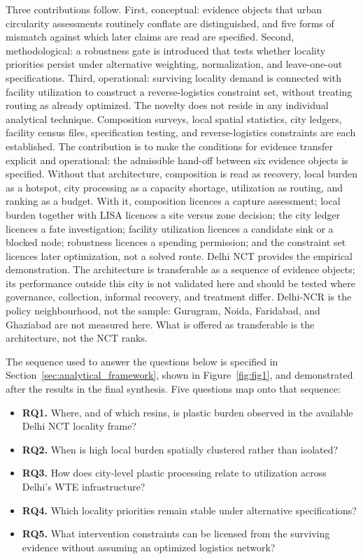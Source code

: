 \documentclass[12pt,a4paper]{article}
\begin{document}
Three contributions follow. First, conceptual: evidence objects that urban circularity assessments routinely conflate are distinguished, and five forms of mismatch against which later claims are read are specified. Second, methodological: a robustness gate is introduced that tests whether locality priorities persist under alternative weighting, normalization, and leave-one-out specifications. Third, operational: surviving locality demand is connected with facility utilization to construct a reverse-logistics constraint set, without treating routing as already optimized. The novelty does not reside in any individual analytical technique. Composition surveys, local spatial statistics, city ledgers, facility census files, specification testing, and reverse-logistics constraints are each established. The contribution is to make the conditions for evidence transfer explicit and operational: the admissible hand-off between six evidence objects is specified. Without that architecture, composition is read as recovery, local burden as a hotspot, city processing as a capacity shortage, utilization as routing, and ranking as a budget. With it, composition licences a capture assessment; local burden together with LISA licences a site versus zone decision; the city ledger licences a fate investigation; facility utilization licences a candidate sink or a blocked node; robustness licences a spending permission; and the constraint set licences later optimization, not a solved route. Delhi NCT provides the empirical demonstration. The architecture is transferable as a sequence of evidence objects; its performance outside this city is not validated here and should be tested where governance, collection, informal recovery, and treatment differ. Delhi-NCR is the policy neighbourhood, not the sample: Gurugram, Noida, Faridabad, and Ghaziabad are not measured here. What is offered as transferable is the architecture, not the NCT ranks.

The sequence used to answer the questions below is specified in Section~\ref{sec:analytical_framework}, shown in Figure~\ref{fig:fig1}, and demonstrated after the results in the final synthesis. Five questions map onto that sequence:

\begin{itemize}
\itemsep0.4em
\item \textbf{RQ1.} Where, and of which resins, is plastic burden observed in the available Delhi NCT locality frame?
\item \textbf{RQ2.} When is high local burden spatially clustered rather than isolated?
\item \textbf{RQ3.} How does city-level plastic processing relate to utilization across Delhi's WTE infrastructure?
\item \textbf{RQ4.} Which locality priorities remain stable under alternative specifications?
\item \textbf{RQ5.} What intervention constraints can be licensed from the surviving evidence without assuming an optimized logistics network?
\end{itemize}
\end{document}
